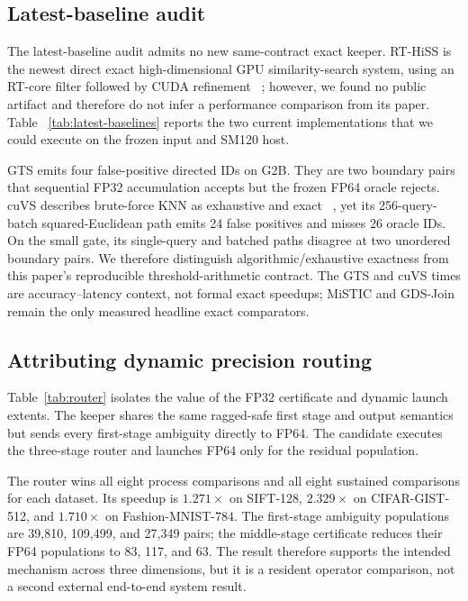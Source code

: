 \documentclass[sigconf,review,anonymous]{acmart}
\begin{document}
\subsection{Latest-baseline audit}

The latest-baseline audit admits no new same-contract exact keeper.
RT-HiSS is the newest direct exact high-dimensional GPU similarity-search
system, using an RT-core filter followed by CUDA refinement
~\cite{munugala2026rthiss}; however, we found no public artifact and therefore
do not infer a performance comparison from its paper.  Table
~\ref{tab:latest-baselines} reports the two current implementations that we
could execute on the frozen input and SM120 host.



GTS emits four false-positive directed IDs on G2B.  They are two boundary
pairs that sequential FP32 accumulation accepts but the frozen FP64 oracle
rejects.  cuVS describes brute-force KNN as exhaustive and exact
~\cite{nvidiacuvsbruteforce}, yet its 256-query-batch squared-Euclidean path
emits 24 false positives and misses 26 oracle IDs.  On the small gate, its
single-query and batched paths disagree at two unordered boundary pairs.  We
therefore distinguish algorithmic/exhaustive exactness from this paper's
reproducible threshold-arithmetic contract.  The GTS and cuVS times are
accuracy--latency context, not formal exact speedups; MiSTIC and GDS-Join remain
the only measured headline exact comparators.

\subsection{Attributing dynamic precision routing}

Table~\ref{tab:router} isolates the value of the FP32 certificate and dynamic
launch extents.  The keeper shares the same ragged-safe first stage and output
semantics but sends every first-stage ambiguity directly to FP64.  The
candidate executes the three-stage router and launches FP64 only for the
residual population.



The router wins all eight process comparisons and all eight sustained
comparisons for each dataset.  Its speedup is $1.271\times$ on SIFT-128,
$2.329\times$ on CIFAR-GIST-512, and $1.710\times$ on Fashion-MNIST-784.  The
first-stage ambiguity populations are 39,810, 109,499, and 27,349 pairs; the
middle-stage certificate reduces their FP64 populations to 83, 117, and 63.
The result therefore supports the intended mechanism across three dimensions,
but it is a resident operator comparison, not a second external end-to-end
system result.
\end{document}
